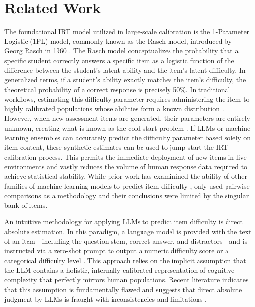 \documentclass[11pt]{article}
\begin{document}
\section{Related Work}
\label{sec:related}

The foundational IRT model utilized in large-scale calibration is the 1-Parameter Logistic (1PL) model, commonly known as the Rasch model, introduced by Georg Rasch in 1960 \citep{zotero-item-1169, kolesnikovaEstimatingItemDifficulty2026}. The Rasch model conceptualizes the probability that a specific student correctly answers a specific item as a logistic function of the difference between the student's latent ability and the item's latent difficulty. In generalized terms, if a student's ability exactly matches the item's difficulty, the theoretical probability of a correct response is precisely 50\%. In traditional workflows, estimating this difficulty parameter requires administering the item to highly calibrated populations whose abilities form a known distribution \citep{feliceBritishCouncilSubmission}. However, when new assessment items are generated, their parameters are entirely unknown, creating what is known as the cold-start problem \citep{wainerComputerizedAdaptiveTesting2000}. If LLMs or machine learning ensembles can accurately predict the difficulty parameter based solely on item content, these synthetic estimates can be used to jump-start the IRT calibration process. This permits the immediate deployment of new items in live environments and vastly reduces the volume of human response data required to achieve statistical stability. While prior work has examinined the ability of other families of machine learning models to predict item difficulty \citep{feliceBritishCouncilSubmission, kapoorPredictionItemDifficulty2025}, only \citet{kolesnikovaEstimatingItemDifficulty2026} used pairwise comparisons as a methodology and their conclusions were limited by the singular bank of items.

An intuitive methodology for applying LLMs to predict item difficulty is direct absolute estimation. In this paradigm, a language model is provided with the text of an item—including the question stem, correct answer, and distractors—and is instructed via a zero-shot prompt to output a numeric difficulty score or a categorical difficulty level \citep{kolesnikovaEstimatingItemDifficulty2026}. This approach relies on the implicit assumption that the LLM contains a holistic, internally calibrated representation of cognitive complexity that perfectly mirrors human populations. Recent literature indicates that this assumption is fundamentally flawed and suggests that direct absolute judgment by LLMs is fraught with inconsistencies and limitations \citep{lichtMeasuringScalarConstructs2025, liCanLLMsEstimate2026, wangCanLLMsReally2026}. 
\end{document}
